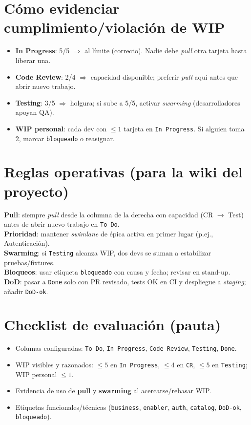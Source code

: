 \documentclass[11pt]{article}
\begin{document}
\section*{Cómo evidenciar cumplimiento/violación de WIP}
\begin{itemize}[leftmargin=1.5em]
  \item \textbf{In Progress}: 5/5 \(\Rightarrow\) al límite (correcto). Nadie debe \emph{pull} otra tarjeta hasta liberar una.
  \item \textbf{Code Review}: 2/4 \(\Rightarrow\) capacidad disponible; preferir \emph{pull} aquí antes que abrir nuevo trabajo.
  \item \textbf{Testing}: 3/5 \(\Rightarrow\) holgura; si sube a 5/5, activar \emph{swarming} (desarrolladores apoyan QA).
  \item \textbf{WIP personal}: cada dev con \(\leq 1\) tarjeta en \texttt{In Progress}. Si alguien toma 2, marcar \texttt{bloqueado} o reasignar.
\end{itemize}

\section*{Reglas operativas (para la wiki del proyecto)}
\begin{tcolorbox}
\textbf{Pull}: siempre \emph{pull} desde la columna de la derecha con capacidad (CR \(\to\) Test) antes de abrir nuevo trabajo en \texttt{To Do}.\\[2pt]
\textbf{Prioridad}: mantener \emph{swimlane} de épica activa en primer lugar (p.ej., Autenticación).\\[2pt]
\textbf{Swarming}: si \texttt{Testing} alcanza WIP, dos devs se suman a estabilizar pruebas/fixtures.\\[2pt]
\textbf{Bloqueos}: usar etiqueta \texttt{bloqueado} con causa y fecha; revisar en stand-up.\\[2pt]
\textbf{DoD}: pasar a \texttt{Done} solo con PR revisado, tests OK en CI y despliegue a \emph{staging}; añadir \texttt{DoD-ok}.
\end{tcolorbox}

\section*{Checklist de evaluación (pauta)}
\begin{itemize}[leftmargin=1.5em]
  \item Columas configuradas: \texttt{To Do}, \texttt{In Progress}, \texttt{Code Review}, \texttt{Testing}, \texttt{Done}.
  \item WIP visibles y razonados: \(\leq 5\) en \texttt{In Progress}, \(\leq 4\) en \texttt{CR}, \(\leq 5\) en \texttt{Testing}; WIP personal \(\leq 1\).
  \item Evidencia de uso de \textbf{pull} y \textbf{swarming} al acercarse/rebasar WIP.
  \item Etiquetas funcionales/técnicas (\texttt{business}, \texttt{enabler}, \texttt{auth}, \texttt{catalog}, \texttt{DoD-ok}, \texttt{bloqueado}).
\end{itemize}
\end{document}
